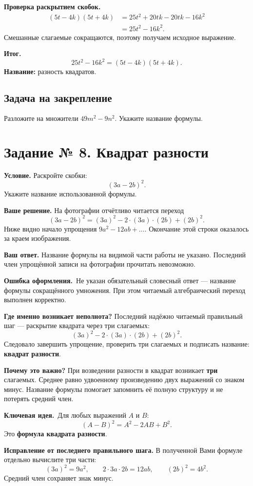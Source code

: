 \documentclass[a4paper,11pt]{article}
\newcommand{\keyidea}{\textcolor{blue!60!black}{\textbf{Ключевая идея.}}\ }
\newcommand{\errorlabel}{\textcolor{red!75!black}{\textbf{Ошибка оформления.}}\ }
\newcommand{\outcome}{\textcolor{accent}{\textbf{Итог.}}\ }
\begin{document}
\textbf{Проверка раскрытием скобок.}
\begin{align*}
(5t-4k)(5t+4k)
 &=25t^2+20tk-20tk-16k^2\\
 &=25t^2-16k^2.
\end{align*}
Смешанные слагаемые сокращаются, поэтому получаем исходное выражение.

\outcome
\[
\boxed{25t^2-16k^2=(5t-4k)(5t+4k).}
\]
\textbf{Название:} разность квадратов.

\subsection*{Задача на закрепление}
Разложите на множители $49m^2-9n^2$. Укажите название формулы.

\clearpage
{}\label{task:8}
\section*{Задание № 8. Квадрат разности}
\textbf{Условие.} Раскройте скобки:
\[
(3a-2b)^2.
\]
Укажите название использованной формулы.

\textbf{Ваше решение.} На фотографии отчётливо читается переход
\[
(3a-2b)^2=(3a)^2-2\cdot(3a)\cdot(2b)+(2b)^2.
\]
Ниже видно начало упрощения $9a^2-12ab+\ldots$. Окончание этой строки оказалось за краем изображения.

\textbf{Ваш ответ.} Название формулы на видимой части работы не указано. Последний член упрощённой записи на фотографии прочитать невозможно.

\errorlabel Не указан обязательный словесный ответ --- название формулы сокращённого умножения. При этом читаемый алгебраический переход выполнен корректно.

\textbf{Где именно возникает неполнота?} Последний надёжно читаемый правильный шаг --- раскрытие квадрата через три слагаемых:
\[
(3a)^2-2\cdot(3a)\cdot(2b)+(2b)^2.
\]
Следовало завершить упрощение, проверить три слагаемых и подписать название: \textbf{квадрат разности}.

\textbf{Почему это важно?} При возведении разности в квадрат возникает \textbf{три} слагаемых. Среднее равно удвоенному произведению двух выражений со знаком минус. Название формулы помогает запомнить её полную структуру и не потерять средний член.

\keyidea Для любых выражений $A$ и $B$:
\[
\boxed{(A-B)^2=A^2-2AB+B^2.}
\]
Это \textbf{формула квадрата разности}.

\textbf{Исправление от последнего правильного шага.} В полученной Вами формуле отдельно вычислите три части:
\[
(3a)^2=9a^2,
\qquad
2\cdot3a\cdot2b=12ab,
\qquad
(2b)^2=4b^2.
\]
Средний член сохраняет знак минус.
\end{document}

